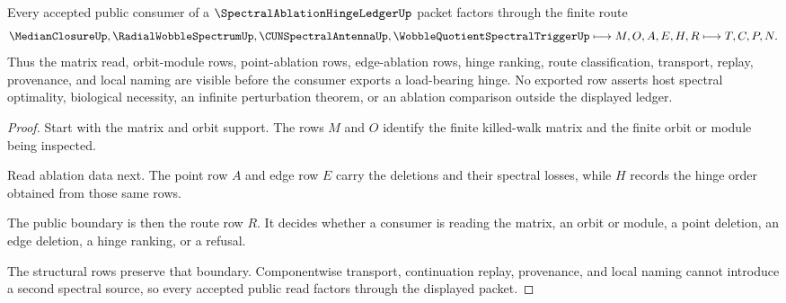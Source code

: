 \begin{theorem}
\label{thm:spectral-ablation-hinge-ledger-public-route}
Every accepted public consumer of a $\SpectralAblationHingeLedgerUp$ packet factors through the finite route
$$
\MedianClosureUp,\RadialWobbleSpectrumUp,\CUNSpectralAntennaUp,\WobbleQuotientSpectralTriggerUp
\longmapsto M,O,A,E,H,R \longmapsto T,C,P,N .
$$
Thus the matrix read, orbit-module rows, point-ablation rows, edge-ablation rows, hinge ranking, route classification, transport, replay, provenance, and local naming are visible before the consumer exports a load-bearing hinge. No exported row asserts host spectral optimality, biological necessity, an infinite perturbation theorem, or an ablation comparison outside the displayed ledger.
\end{theorem}
\begin{proof}
Start with the matrix and orbit support. The rows $M$ and $O$ identify the finite killed-walk matrix and the finite orbit or module being inspected.

Read ablation data next. The point row $A$ and edge row $E$ carry the deletions and their spectral losses, while $H$ records the hinge order obtained from those same rows.

The public boundary is then the route row $R$. It decides whether a consumer is reading the matrix, an orbit or module, a point deletion, an edge deletion, a hinge ranking, or a refusal.

The structural rows preserve that boundary. Componentwise transport, continuation replay, provenance, and local naming cannot introduce a second spectral source, so every accepted public read factors through the displayed packet.
\end{proof}

